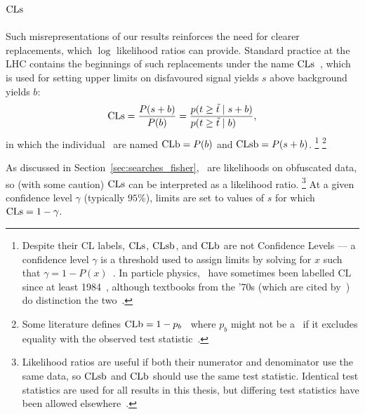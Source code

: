 \subsection{\texorpdfstring{$\mathrm{CLs}$}{CLs}}
Such misrepresentations of our results reinforces the need for clearer
replacements, which $\log$ likelihood ratios can provide.
Standard practice at the LHC contains the beginnings of such
replacements under the name $\mathrm{CLs}$~\cite{
read2000modified,
Read2002cls,
junk1999confidence,
read1997optimal,
bock1998lower,
etde1998prospects,
lep2000searches,
lep2003search,
Murray2010heretic,
cern2011procedure,
pdg2022ynf
},
which is used for setting upper limits on disfavoured signal yields $s$
above background yields $b$:
\begin{equation}
\label{eqn:searches_cls}
\cls
=
\frac{P(s + b)}{P(b)}
=
\frac{
\prob{t \geq \tilde{t}}{s + b}
}{
\prob{t \geq \tilde{t}}{b}\hfill
}
,
\end{equation}
in which the individual \pvalues\ are named
$\mathrm{CLb} = P(b)$ and
$\mathrm{CLsb} = P(s + b)$.%
\footnote{%
Despite their $\mathrm{CL}$ labels, $\mathrm{CLs}$, $\mathrm{CLsb}$, and $\mathrm{CLb}$ are not
Confidence Levels ---
a confidence level $\gamma$ is a threshold used to assign limits by solving
for $x$ such that $\gamma = 1 - P(x)$~\cite{pdg1996}.
In particle physics, \pvalues\ have sometimes been labelled $\mathrm{CL}$ since
at least 1984~\cite{pdg1984}, although textbooks from the '70s (which are cited
by~\cite{pdg1984}) do distinction the two~\cite{
eadie1971statistical,
frodesen1979probability
}.%
}%
\footnote{%
Some literature defines $\mathrm{CLb} = 1 - p_b$~\cite{
Cowan:2010js,
pdg2022ynf
}
where $p_b$ might not be a \pvalue\ if it excludes equality with the
observed test statistic~\cite{cern2011procedure}.
}

As discussed in Section~\ref{sec:searches_fisher}, \pvalues\ are likelihoods
on obfuscated data, so (with some caution) $\mathrm{CLs}$ can be interpreted as a
likelihood ratio.%
\footnote{%
Likelihood ratios are useful if both their numerator and denominator use the
same data, so $\mathrm{CLsb}$ and $\mathrm{CLb}$ should use the same test statistic.
Identical test statistics are used for all results in this thesis, but
differing test statistics have been allowed elsewhere~\cite{bock1998lower}.
}%
At a given confidence level $\gamma$ (typically $95\%$), limits are set to
values of $s$ for which $\mathrm{CLs} = 1 - \gamma$.


